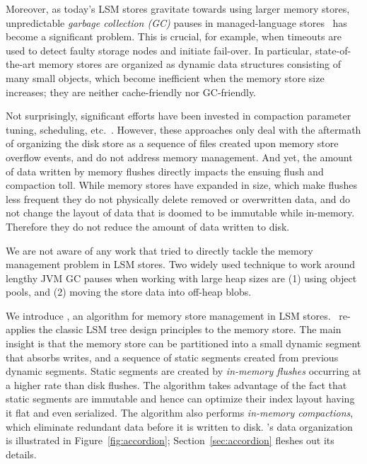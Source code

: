 Moreover, as today's LSM stores gravitate towards using larger memory stores, unpredictable \emph{garbage collection (GC)} pauses in managed-language stores~\cite{cassandra, HBase} has become a significant problem.
This is crucial, for example, when timeouts are used to detect faulty storage nodes and initiate fail-over.
In particular, state-of-the-art memory stores are organized as dynamic data structures consisting of many small objects,
which become inefficient when the memory store size increases; they are neither cache-friendly nor GC-friendly.

Not surprisingly, significant efforts have been invested in compaction parameter tuning, scheduling, etc.~\cite{hbasetuning,
universalcompaction,scylladbcompaction,Sears:2012}. However, these approaches only deal with the aftermath
of organizing the disk store as a sequence of files created upon memory store overflow events, and do not 
address memory management. 
And yet, the amount of data written by memory flushes  
directly impacts the ensuing flush and compaction toll. 
While memory stores have expanded in size, which make flushes less frequent 
they do not physically delete removed or overwritten data, and do not change the layout of data that is doomed to be immutable while in-memory.
Therefore they do not reduce the amount of data written to disk.

We are not aware of any work that tried to directly tackle the memory management problem in LSM stores. 
Two widely used technique to work around lengthy JVM GC pauses when working with large heap sizes are (1) using object pools, and (2) moving the store data into off-heap blobs. 

We introduce \sys, an algorithm for memory store management in LSM stores. 
\sys\ re-applies the classic LSM tree design principles to the memory store. The main insight is that the memory store can be partitioned
 into a small dynamic segment that absorbs writes, and a sequence of static segments created 
 from previous dynamic segments. Static segments are created by \emph{in-memory flushes} occurring at a higher rate
 than disk flushes.  The algorithm takes advantage of the fact that static segments are immutable and hence can optimize their index layout having it flat and even serialized.
 The algorithm also performs \emph{in-memory compactions}, which eliminate redundant %
 data before it is written to disk.
\sys's data organization is illustrated in Figure~\ref{fig:accordion};
 Section~\ref{sec:accordion} fleshes out its details.


